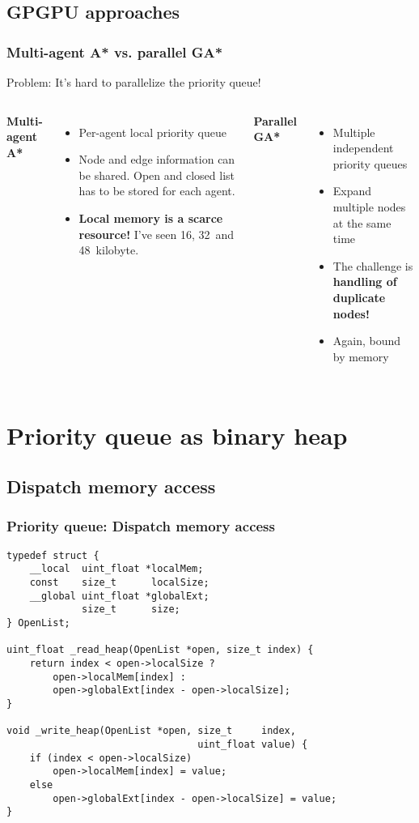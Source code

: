 \documentclass{beamer}
\begin{document}
\subsection{GPGPU approaches}
\begin{frame}
    \frametitle{Multi-agent A* vs. parallel GA*}
    Problem: It's hard to parallelize the priority queue!
    
    \vspace{1em}
    \begin{columns}[T]
        \textbf{Multi-agent A*}~\cite{silva2011gpu}
        \begin{itemize}
            \item Per-agent local priority queue
            \item Node and edge information can be shared. Open and closed list has to be stored for each agent.
            \item \textbf{Local memory is a scarce resource!} I've seen 16, 32~and 48~kilobyte.
        \end{itemize}
        
        \textbf{Parallel GA*}~\cite{zhou2015massively}
        \begin{itemize}
            \item Multiple independent priority queues
            \item Expand multiple nodes at the same time
            \item The challenge is \textbf{handling of duplicate nodes!}
            \item Again, bound by memory
        \end{itemize}
    \end{columns}
\end{frame}

\section{Priority queue as binary heap}
\subsection{Dispatch memory access}
\begin{frame}[fragile]
    \frametitle{Priority queue: Dispatch memory access}
    \begin{lstlisting}
typedef struct {
    __local  uint_float *localMem;
    const    size_t      localSize;
    __global uint_float *globalExt;
             size_t      size;
} OpenList;

uint_float _read_heap(OpenList *open, size_t index) {
    return index < open->localSize ?
        open->localMem[index] :
        open->globalExt[index - open->localSize];
}

void _write_heap(OpenList *open, size_t     index,
                                 uint_float value) {
    if (index < open->localSize)
        open->localMem[index] = value;
    else
        open->globalExt[index - open->localSize] = value;
}
    \end{lstlisting}
\end{frame}
\end{document}
